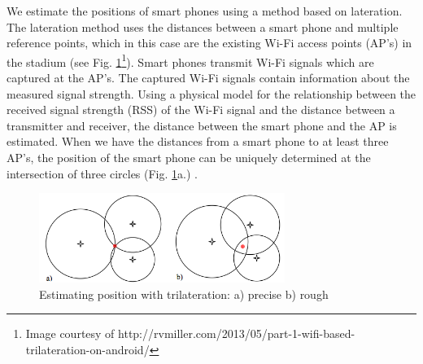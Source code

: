 \documentclass[10pt,a4paper]{article}
\begin{document}
We estimate the positions of smart phones using a method based on lateration. 
The lateration method uses the distances between a smart phone and multiple reference points, which in this case are the existing Wi-Fi access points (AP's) in the stadium (see Fig. \ref{fig:trilateration}\footnote{Image courtesy of http://rvmiller.com/2013/05/part-1-wifi-based-trilateration-on-android/ }).
Smart phones transmit Wi-Fi signals which are captured at the AP's.
The captured Wi-Fi signals contain information about the measured signal strength.
Using a physical model for the relationship between the received signal strength (RSS) of the Wi-Fi signal and the distance between a transmitter and receiver, the distance between the smart phone and the AP is estimated. When we have the distances from a smart phone to at least three AP's, the position of the smart phone can be uniquely determined at the intersection of three circles (Fig. \ref{fig:trilateration}a.) \cite{kushki:1}.

\begin{figure}[h!]
	\centering
	\includegraphics[width=80mm]{trilateration.png}
	\caption{Estimating position with trilateration: a) precise b) rough }
	\label{fig:trilateration}
\end{figure}

\end{document}
